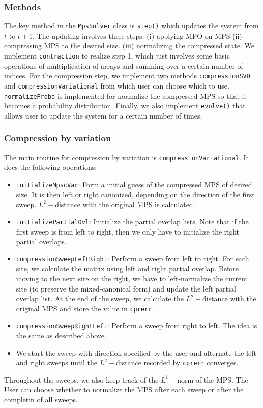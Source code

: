 \documentclass[english]{article}
\begin{document}
\subsubsection{Methods}
The key method in the \texttt{MpsSolver} class is \texttt{step()} which updates the system from $t$ to $t+1$. The updating involves three steps: (i) applying MPO on MPS (ii) compressing MPS to the desired size. (iii) normalizing the compressed state. We implement \texttt{contraction} to realize step 1, which just involves some basic operations of multiplication of arrays and summing over a certain number of indices. For the compression step, we implement two methods \texttt{compressionSVD} and \texttt{compressionVariational} from which user can choose which to use. \texttt{normalizeProba} is implemented for normalize the compressed MPS so that it becomes a probability distribution. Finally, we also implement \texttt{evolve()} that allows user to update the system for a certain number of times.
\subsubsection{Compression by variation}
The main routine for compression by variation is \texttt{compressionVariational}. It does the following operations:
\begin{itemize}
\item \texttt{initializeMpscVar}: Form a initial guess of the compressed MPS of desired size. It is then left or right canonized, depending on the direction of the first sweep. $L^2-$distance with the original MPS is calculated. 
\item \texttt{initializePartialOvl}: Initialize the partial overlap lists. Note that if the first sweep is from left to right, then we only have to initialize the right partial overlaps.
\item \texttt{compressionSweepLeftRight}: Perform a sweep from left to right. For each site, we calculate the matrix using left and right partial overlap. Before moving to the next site on the right, we have to left-normalize the current site (to preserve the mixed-canonical form) and update the left partial overlap list. At the end of the sweep, we calculate the $L^2-$distance with the original MPS and store the value in \texttt{cpr\textunderscore err}.
\item \texttt{compressionSweepRightLeft}: Perform a sweep from right to left. The idea is the same as described above.
\item We start the sweep with direction specified by the user and alternate the left and right sweeps until the $L^2-$distance recorded by \texttt{cpr\textunderscore err} converges.
\end{itemize}
Throughout the sweeps, we also keep track of the $L^1-$norm of the MPS. The User can choose whether to normalize the MPS after each sweep or after the completin of all sweeps.
\end{document}
